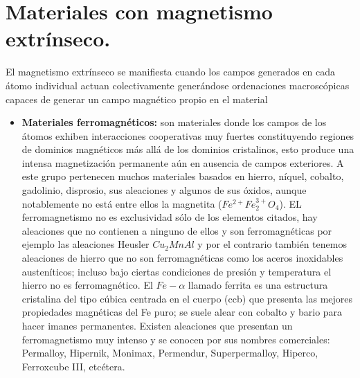 \section{Materiales con magnetismo extrínseco.}

El magnetismo extrínseco se manifiesta cuando los campos generados en cada átomo individual actuan colectivamente generándose ordenaciones macroscópicas capaces de generar un campo magnético propio en el material

\begin{itemize}

	\item \textbf{Materiales ferromagnéticos:} 
son materiales donde los campos de los átomos exhiben interacciones cooperativas muy fuertes constituyendo regiones de dominios magnéticos más allá de los dominios cristalinos, esto produce una intensa magnetización permanente aún en ausencia de campos exteriores. A este grupo pertenecen muchos materiales basados en hierro, níquel, cobalto, gadolinio, disprosio, sus aleaciones y algunos de sus óxidos, aunque notablemente no está entre ellos la magnetita ($Fe^{2+}Fe^{3+}_{2}O_{4}$). EL ferromagnetismo no es exclusividad sólo de los elementos citados, hay aleaciones que no contienen a ninguno de ellos y son ferromagnéticas por ejemplo las aleaciones Heusler $Cu_{2}MnAl$ y por el contrario también tenemos aleaciones de hierro que no son ferromagnéticas como los aceros inoxidables austeníticos; incluso bajo ciertas condiciones de presión y temperatura el hierro no es ferromagnético. El $Fe-\alpha$ llamado ferrita es una estructura cristalina del tipo cúbica centrada en el cuerpo (ccb) que presenta las mejores propiedades magnéticas del Fe puro; se suele alear con cobalto y bario para hacer imanes permanentes. Existen aleaciones que presentan un ferromagnetismo muy intenso y se conocen por sus nombres comerciales: Permalloy, Hipernik, Monimax, Permendur, Superpermalloy, Hiperco, Ferroxcube III, etcétera.


\end{itemize}

